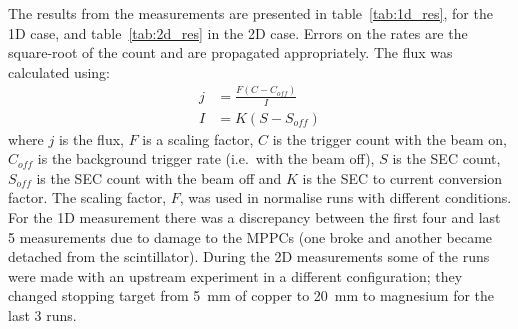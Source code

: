 The results from the measurements are presented in table~\ref{tab:1d_res}, for the 1D case, and table~\ref{tab:2d_res} in the 2D case. Errors on the rates are the square-root of the count and are propagated appropriately. The flux was calculated using:
\begin{align}
    j &= \frac{F(C - C_{off})}{I} \\
    I &= K(S - S_{off})
\end{align}
where \(j\) is the flux, \(F\) is a scaling factor, \(C\) is the trigger count with the beam on, \(C_{off}\) is the background trigger rate (i.e.\ with the beam off), \(S\) is the SEC count, \(S_{off}\) is the SEC count with the beam off and \(K\) is the SEC to current conversion factor. The scaling factor, \(F\), was  used in normalise runs with different conditions. For the 1D measurement there was a discrepancy between the first four and last 5 measurements due to damage to the MPPCs (one broke and another became detached from the scintillator). During the 2D measurements some of the runs were made with an upstream experiment in a different configuration; they changed stopping target from 5~mm of copper to 20~mm to magnesium for the last 3 runs.

